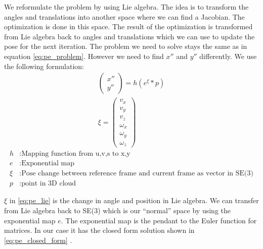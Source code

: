 \documentclass[11pt,a4paper,titlepage,oneside]{report}
\begin{document}
We reformulate the problem by using Lie algebra. The idea is to transform the angles and translations into another space where we can find a Jacobian. The optimization is done in this space. The result of the optimization is transformed from Lie algebra back to angles and translations which we can use to update the pose for the next iteration. The problem we need to solve stays the same as in equation \ref{eq:pe_problem}. However we need to find $x''$ and $y''$ differently. We use the following formulation:
\begin{equation}\label{eq:pe_lie}
  \begin{gathered}
    \begin{pmatrix}
      x''\\
      y''
    \end{pmatrix}
    =h(e^{\xi}*p)\\
    \xi=\begin{pmatrix}
      v_x\\
      v_y\\
      v_z\\
      \omega_x\\
      \omega_y\\
      \omega_z
    \end{pmatrix}
  \end{gathered}
\end{equation}
\begin{align*}
  h      &:  \text{Mapping function from u,v,s to x,y}\\
  e      &:  \text{Exponential map}\\
  \xi    &:  \text{Pose change between reference frame and current frame as vector in SE(3)}\\
  p      &:  \text{point in 3D cloud}
\end{align*}

$\xi$ in \ref{eq:pe_lie} is the change in angle and position in Lie algebra. We can transfer from Lie algebra back to SE(3) which is our ``normal'' space by using the exponential map $e$. The exponential map is the pendant to the Euler function for matrices. In our case it has the closed form solution shown in \ref{eq:pe_closed_form} \cite{rvc}.
\end{document}

